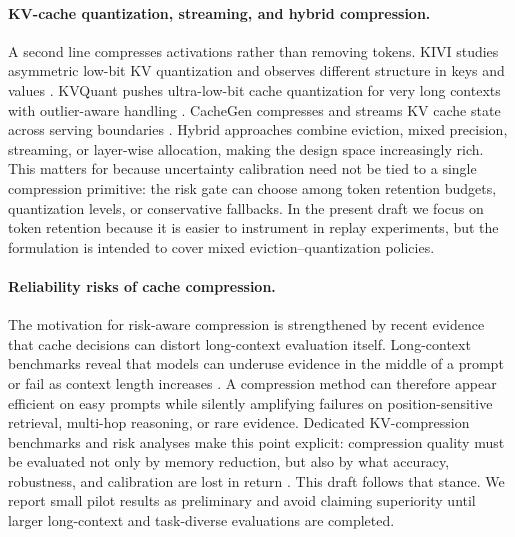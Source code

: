 \paragraph{KV-cache quantization, streaming, and hybrid compression.}
A second line compresses activations rather than removing tokens. KIVI studies asymmetric low-bit KV quantization and observes different structure in keys and values \citep{liu2024kivi}. KVQuant pushes ultra-low-bit cache quantization for very long contexts with outlier-aware handling \citep{hooper2024kvquant}. CacheGen compresses and streams KV cache state across serving boundaries \citep{liu2024cachegen}. Hybrid approaches combine eviction, mixed precision, streaming, or layer-wise allocation, making the design space increasingly rich. This matters for \uckv{} because uncertainty calibration need not be tied to a single compression primitive: the risk gate can choose among token retention budgets, quantization levels, or conservative fallbacks. In the present draft we focus on token retention because it is easier to instrument in replay experiments, but the formulation is intended to cover mixed eviction--quantization policies.

\paragraph{Reliability risks of cache compression.}
The motivation for risk-aware compression is strengthened by recent evidence that cache decisions can distort long-context evaluation itself. Long-context benchmarks reveal that models can underuse evidence in the middle of a prompt or fail as context length increases \citep{liu2024lost,bai2024longbench,hsieh2024ruler,zhang2024infinitebench,li2024needlebench}. A compression method can therefore appear efficient on easy prompts while silently amplifying failures on position-sensitive retrieval, multi-hop reasoning, or rare evidence. Dedicated KV-compression benchmarks and risk analyses make this point explicit: compression quality must be evaluated not only by memory reduction, but also by what accuracy, robustness, and calibration are lost in return \citep{yuan2024kvbenchmark,haverbeck2026risk}. This draft follows that stance. We report small pilot results as preliminary and avoid claiming superiority until larger long-context and task-diverse evaluations are completed.

